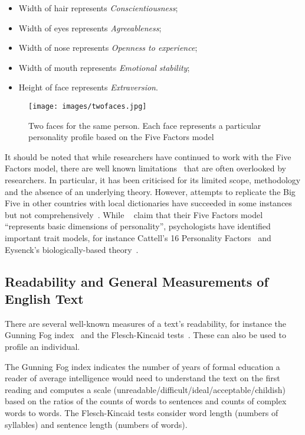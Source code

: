 \documentclass[letterpaper]{article}
\begin{document}
\begin{itemize}
\item Width of hair represents {\emph{Conscientiousness}}; 
\item Width of eyes represents {\emph{Agreeableness}};
\item Width of nose represents {\emph{Openness to experience}}; 
\item Width of mouth represents {\emph{Emotional stability}};
\item Height of face represents {\emph{Extraversion}}.
\end{itemize}

\begin{figure}[!htb]
\centering
\texttt{[image: images/twofaces.jpg]}
\caption{Two faces for the same person. Each face represents a particular personality profile based on the Five Factors model}
\label{fig:twofaces}
\end{figure}

It should be noted that while researchers have continued to work with
the Five Factors model, there are well known
limitations~\cite{eysenck:1992,paunonen+jackson:2000,block:2010} that
are often overlooked by researchers. In particular, it has been
criticised for its limited scope, methodology and the absence of an
underlying theory. However, attempts to replicate the Big Five in other
countries with local dictionaries have succeeded in some instances but
not comprehensively~\cite{szirmak+deraad:1994,defruyt-et-al:2004}. While
\citeauthor{costa+mccrae:1992}~ claim
that their Five Factors model ``represents basic dimensions of
personality'', psychologists have identified important trait models,
for instance Cattell's 16 Personality Factors~\cite{cattell:1946} and
Eysenck's biologically-based theory~\cite{eysenck:1947}.


\subsection{Readability and General Measurements of English Text}

There are several well-known measures of a text's readability, for
instance the Gunning Fog index~\cite{gunning:1968} and the
Flesch-Kincaid tests~\cite{kincaid-et-al:1975}. These can also be used
to profile an individual.

The Gunning Fog index indicates the number of years of formal
education a reader of average intelligence would need to understand
the text on the first reading and computes a scale
(unreadable/difficult/ideal/acceptable/childish) based on the ratios
of the counts of words to sentences and counts of complex words to
words. The Flesch-Kincaid tests consider word length (numbers of
syllables) and sentence length (numbers of words).
\end{document}
